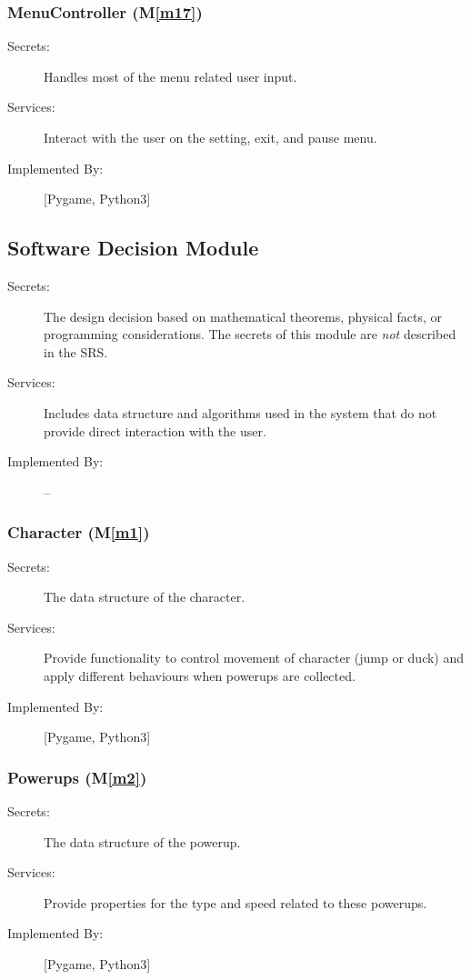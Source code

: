 \documentclass[12pt, titlepage]{article}
\newcommand{\mref}[1]{M\ref{#1}}
\begin{document}
\subsubsection{MenuController (\mref{m17})}
\begin{description}
\item[Secrets:] Handles most of the menu related user input.
\item[Services:] Interact with the user on the setting, exit, and pause menu.
\item[Implemented By:] [Pygame, Python3]
\end{description}

\subsection{Software Decision Module}

\begin{description}
\item[Secrets:] The design decision based on mathematical theorems, physical
  facts, or programming considerations. The secrets of this module are
  \emph{not} described in the SRS.
\item[Services:] Includes data structure and algorithms used in the system that
  do not provide direct interaction with the user. 
\item[Implemented By:] --
\end{description}

\subsubsection{Character (\mref{m1})}
\begin{description}
\item[Secrets:] The data structure of the character.
\item[Services:] Provide functionality to control movement of character (jump or duck) and apply different behaviours when powerups are collected.
\item[Implemented By:] [Pygame, Python3]
\end{description}

\subsubsection{Powerups (\mref{m2})}
\begin{description}
\item[Secrets:] The data structure of the powerup.
\item[Services:] Provide properties for the type and speed related to these powerups.
\item[Implemented By:] [Pygame, Python3]
\end{description}
\end{document}
